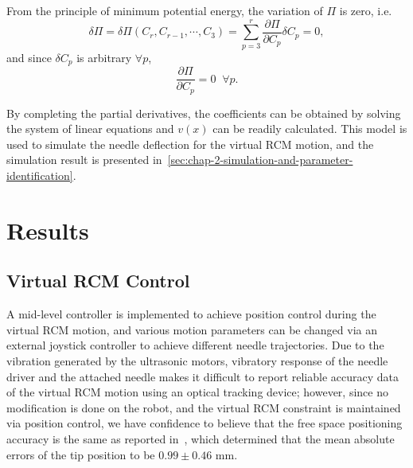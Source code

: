 From the principle of minimum potential energy, the variation of $\Pi$ is zero, i.e.
\begin{equation}
  \delta\Pi = \delta\Pi(C_r, C_{r-1}, \cdots, C_3) = \sum_{p=3}^{r} \frac{\partial\Pi}{\partial C_p}\delta C_p= 0,
\end{equation}
and since $\delta C_p$ is arbitrary $\forall p$,
\begin{equation}
  \frac{\partial\Pi}{\partial C_p} = 0 \;\; \forall p.
\end{equation}

By completing the partial derivatives, the coefficients can be obtained by solving the system of linear equations and $v(x)$ can be readily calculated. This model is used to simulate the needle deflection for the virtual RCM motion, and the simulation result is presented in~\cref{sec:chap-2-simulation-and-parameter-identification}.

\section{Results} 
\label{sec:chap-2-results}

\subsection{Virtual RCM Control} 
\label{sec:chap-2-virtual-rcm-control}


A mid-level controller is implemented to achieve position control during the virtual RCM motion, and various motion parameters can be changed via an external joystick controller to achieve different needle trajectories. Due to the vibration generated by the ultrasonic motors, vibratory response of the needle driver and the attached needle makes it difficult to report reliable accuracy data of the virtual RCM motion using an optical tracking device; however, since no modification is done on the robot, and the virtual RCM constraint is maintained via position control, we have confidence to believe that the free space positioning accuracy is the same as reported in~\parencite{liFullyActuatedBodyMounted2020a}, which determined that the mean absolute errors of the tip position to be $0.99 \pm 0.46$ mm.

